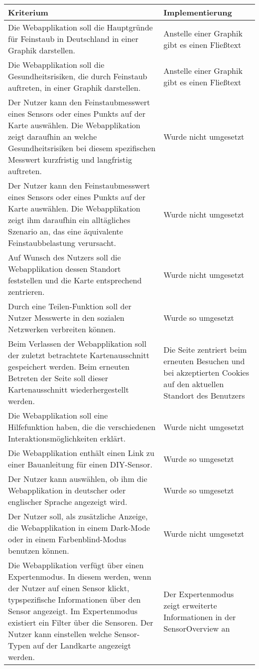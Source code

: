     \begin{tabularx}{\textwidth}{| X | X |}
        \hline
        \textbf{Kriterium} & 
        \textbf{Implementierung}\\
        \hline
        Die Webapplikation soll die Hauptgründe für Feinstaub in Deutschland in einer Graphik darstellen. & Anstelle einer Graphik gibt es einen Fließtext \\
        \hline
        Die Webapplikation soll die Gesundheitsrisiken, die durch Feinstaub auftreten, in einer Graphik darstellen. & Anstelle einer Graphik gibt es einen Fließtext \\
        \hline
        Der Nutzer kann den Feinstaubmesswert eines Sensors oder eines Punkts auf der Karte auswählen. 
        Die Webapplikation zeigt daraufhin an welche Gesundheitsrisiken bei diesem spezifischen Messwert kurzfristig und langfristig auftreten. & Wurde nicht umgesetzt \\
        \hline
        Der Nutzer kann den Feinstaubmesswert eines Sensors oder eines Punkts auf der Karte auswählen. 
        Die Webapplikation zeigt ihm daraufhin ein alltägliches Szenario an, das eine äquivalente Feinstaubbelastung verursacht. & Wurde nicht umgesetzt \\
        \hline
        Auf Wunsch des Nutzers soll die Webapplikation dessen Standort feststellen und die Karte entsprechend zentrieren. & Wurde nicht umgesetzt \\
        \hline
        Durch eine Teilen-Funktion soll der Nutzer Messwerte in den sozialen Netzwerken verbreiten können. & Wurde so umgesetzt \\
        \hline
        Beim Verlassen der Webapplikation soll der zuletzt betrachtete Kartenausschnitt gespeichert werden. Beim erneuten Betreten der Seite soll dieser Kartenausschnitt wiederhergestellt werden. & Die Seite zentriert beim erneuten Besuchen und bei akzeptierten Cookies auf den aktuellen Standort des Benutzers \\
        \hline
        Die Webapplikation soll eine Hilfefunktion haben, die die verschiedenen Interaktionsmöglichkeiten erklärt. & Wurde nicht umgesetzt \\
        \hline
        Die Webapplikation enthält einen Link zu einer Bauanleitung für einen DIY-Sensor. & Wurde so umgesetzt \\
        \hline
        Der Nutzer kann auswählen, ob ihm die Webapplikation in deutscher oder englischer Sprache angezeigt wird. & Wurde so umgesetzt \\
        \hline
        Der Nutzer soll, als zusätzliche Anzeige, die Webapplikation in einem Dark-Mode oder in einem Farbenblind-Modus benutzen können. & Wurde nicht umgesetzt \\
        \hline
        Die Webapplikation verfügt über einen Expertenmodus. In diesem werden, wenn der Nutzer auf einen Sensor klickt, typspezifische Informationen über den Sensor angezeigt.
        Im Expertenmodus existiert ein Filter über die Sensoren. Der Nutzer kann einstellen welche Sensor-Typen auf der Landkarte angezeigt werden. & Der Expertenmodus zeigt erweiterte Informationen in der SensorOverview an\\
        \hline
    \end{tabularx}